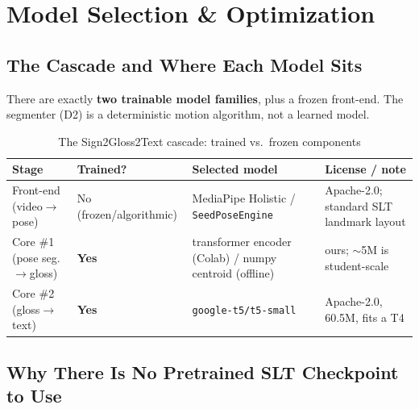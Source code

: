 \documentclass[12pt,a4paper]{article}
\begin{document}
\section{Model Selection \& Optimization}

\subsection{The Cascade and Where Each Model Sits}

There are exactly \textbf{two trainable model families}, plus a frozen front-end. The segmenter (D2) is a deterministic motion algorithm, not a learned model.

\begin{table}[H]
\centering
\caption{The Sign2Gloss2Text cascade: trained vs.\ frozen components}
\small
\begin{tabularx}{\linewidth}{@{} l l l L @{}}
\toprule
\textbf{Stage} & \textbf{Trained?} & \textbf{Selected model} & \textbf{License / note} \\
\midrule
Front-end (video$\rightarrow$pose) & No (frozen/algorithmic) & MediaPipe Holistic / \texttt{SeedPoseEngine} & Apache-2.0; standard SLT landmark layout \\
Core \#1 (pose seg.$\rightarrow$gloss) & \textbf{Yes} & transformer encoder (Colab) / numpy centroid (offline) & ours; $\sim$5M is student-scale \\
Core \#2 (gloss$\rightarrow$text) & \textbf{Yes} & \texttt{google-t5/t5-small} & Apache-2.0, 60.5M, fits a T4 \\
\bottomrule
\end{tabularx}
\end{table}

\subsection{Why There Is No Pretrained SLT Checkpoint to Use}
\end{document}

